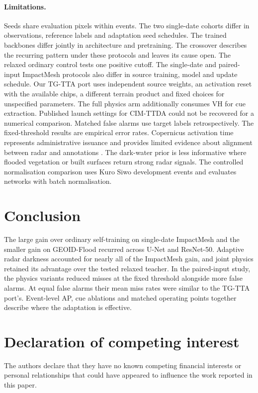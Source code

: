 \documentclass[a4paper,fleqn]{cas-sc}
\begin{document}
\paragraph{Limitations.} Seeds share evaluation pixels within events. The two single-date cohorts differ in observations, reference labels and adaptation seed schedules. The trained backbones differ jointly in architecture and pretraining. The crossover describes the recurring pattern under these protocols and leaves its cause open. The relaxed ordinary control tests one positive cutoff. The single-date and paired-input ImpactMesh protocols also differ in source training, model and update schedule. Our TG-TTA port uses independent source weights, an activation reset with the available chips, a different terrain product and fixed choices for unspecified parameters. The full physics arm additionally consumes VH for cue extraction. Published launch settings for CIM-TTDA could not be recovered for a numerical comparison. Matched false alarms use target labels retrospectively. The fixed-threshold results are empirical error rates. Copernicus activation time represents administrative issuance and provides limited evidence about alignment between radar and annotations \citep{cems_api_2026}. The dark-water prior is less informative where flooded vegetation or built surfaces return strong radar signals. The controlled normalisation comparison uses Kuro Siwo development events and evaluates networks with batch normalisation.

\section{Conclusion}
\label{sec:conclusion}
The large gain over ordinary self-training on single-date ImpactMesh and the smaller gain on GEOID-Flood recurred across U-Net and ResNet-50. Adaptive radar darkness accounted for nearly all of the ImpactMesh gain, and joint physics retained its advantage over the tested relaxed teacher. In the paired-input study, the physics variants reduced misses at the fixed threshold alongside more false alarms. At equal false alarms their mean miss rates were similar to the TG-TTA port's. Event-level AP, cue ablations and matched operating points together describe where the adaptation is effective.

\section*{Declaration of competing interest}
The authors declare that they have no known competing financial interests or personal relationships that could have appeared to influence the work reported in this paper.
\end{document}
